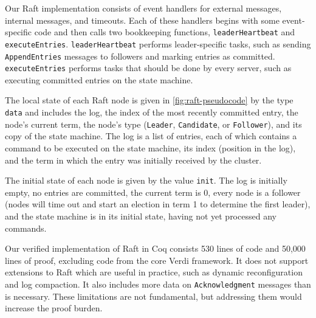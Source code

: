 \begin{sloppypar}
Our Raft implementation consists of event handlers
for external messages, internal messages, and timeouts.
Each of these handlers begins with some event-specific code
and then calls two bookkeeping functions,
\texttt{leaderHeartbeat} and \texttt{executeEntries}.
\texttt{leaderHeartbeat} performs leader-specific tasks,
such as sending \texttt{AppendEntries} messages to followers
and marking entries as committed.
\texttt{executeEntries} performs tasks
that should be done by every server,
such as executing committed entries on the state machine.
\end{sloppypar}


The local state of each Raft node is given in \cref{fig:raft-pseudocode}
by the type \texttt{data}
and includes the log,
the index of the most recently committed entry,
the node's current term,
the node's type (\texttt{Leader}, \texttt{Candidate}, or \texttt{Follower}),
and its copy of the state machine.
The log is a list of entries,
each of which contains
a command to be executed on the state machine,
its index (position in the log),
and the term in which the entry was initially received by the cluster.

The initial state of each node is given
  by the value \texttt{init}.
The log is initially empty,
  no entries are committed,
  the current term is 0,
  every node is a follower
  (nodes will time out and start an election in term 1 to determine the first leader),
  and the state machine is in its initial state,
  having not yet processed any commands.

Our verified implementation of Raft in Coq
  consists 530 lines of code
  and 50,000 lines of proof,
  excluding code from
  the core Verdi framework. It does not support extensions to Raft
  which are useful in practice, such as dynamic reconfiguration and
  log compaction. It also includes more data on \texttt{Acknowledgment}
  messages than is necessary. These limitations are not fundamental,
  but addressing them would increase the proof burden.

